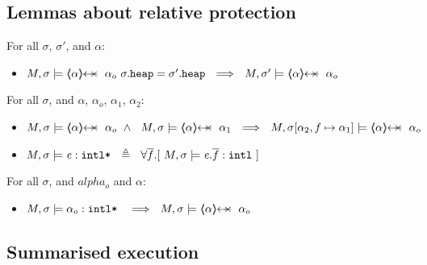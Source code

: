 \subsection{Lemmas about relative protection}


  {
 \begin{lemma} For all $\sigma$, $\sigma'$, and $\alpha$:
\begin{itemize}
\item
$  M, \sigma  \models    { \protectedFrom \alpha {\alpha_o}}  \  \sigma.\prg{heap}= \sigma'.\prg{heap} \ \ \Longrightarrow\ \  M, \sigma' \models      { \protectedFrom \alpha {\alpha_o}} $
\end{itemize}
\end{lemma}
}

{
 \begin{lemma} For all $\sigma$,  and $\alpha$, $\alpha_o$, $\alpha_1$, $\alpha_2$:
\begin{itemize}
\item
$ M, \sigma  \models    {\protectedFrom \alpha  {\alpha_o}}  \  \wedge \ \  M, \sigma  \models    {\protectedFrom \alpha  {\alpha_1}}    \   \ 
\Longrightarrow\ \ M, \sigma[\alpha_2,f \mapsto \alpha_1] \models  \protectedFrom\alpha   {\alpha_o}$
\end{itemize}
\end{lemma}
}

{
\begin{definition}
\begin{itemize}
\item
$M, \sigma \models \mathit{e}:\mbox{\normalfont{\texttt{intl*}}} \ \ \triangleq \ \ \forall \overline{f}.[\  M, \sigma \models \mathit{e}.\overline{f}:\mbox{\normalfont{\texttt{intl}}}\ ]$
\end{itemize}
\end{definition}
}

{
 \begin{lemma} For all $\sigma$, and $alpha_o$ and $\alpha$:
\begin{itemize}
\item
$M, \sigma \models \internalPaths{\alpha_o}  \    \ \ \Longrightarrow\ \ M, \sigma \models {\protectedFrom \alpha {\alpha_o}}$
\end{itemize}
\end{lemma}
}

\subsection{Summarised  execution} 
\label{sect:termExecs}

